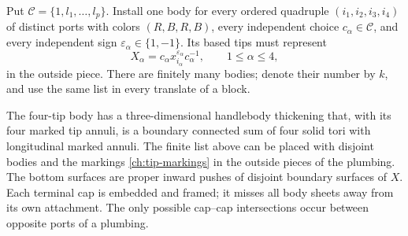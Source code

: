 Put $\mathcal C=\{1,l_1,\ldots,l_p\}$.  Install one body for every
ordered quadruple $(i_1,i_2,i_3,i_4)$ of distinct ports with colors
$(R,B,R,B)$, every independent choice $c_\alpha\in\mathcal C$, and
every independent sign $\varepsilon_\alpha\in\{1,-1\}$.  Its based
tips must represent
\begin{equation}
\label{ch:tip-markings}
 X_\alpha=c_\alpha x_{i_\alpha}^{\varepsilon_\alpha}c_\alpha^{-1},
 \qquad 1\leq\alpha\leq4,
\end{equation}
in the outside piece.  There are finitely many bodies; denote their
number by $k$, and use the same list in every translate of a block.

\begin{lemma}
\label{ch:four-tip-model}
The four-tip body has a three-dimensional handlebody thickening that,
with its four marked tip annuli, is a boundary connected sum of four
solid tori with longitudinal marked annuli.  The finite list above can
be placed with disjoint bodies and the markings
\eqref{ch:tip-markings} in the outside pieces of the plumbing.
The bottom surfaces are proper inward pushes of disjoint boundary
surfaces of $X$.  Each terminal cap is embedded and framed; it misses
all body sheets away from its own attachment.  The only possible
cap--cap intersections occur between opposite ports of a plumbing.
\end{lemma}

